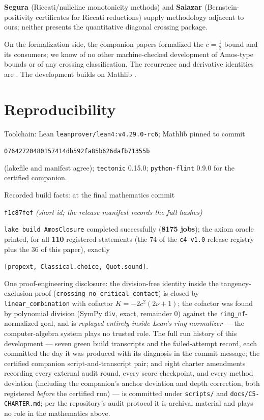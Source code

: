 \documentclass[11pt]{article}
\newcommand{\lean}[1]{\texttt{#1}}
\begin{document}
\textbf{Segura \cite{Segura21}} (Riccati/nullcline monotonicity
methods) and \textbf{Salazar \cite{Salazar26}} (Bernstein-positivity
certificates for Riccati reductions) supply methodology adjacent to
ours; neither presents the quantitative diagonal crossing package.

On the formalization side, the companion papers
\cite{ErikssonC2,ErikssonC3,ErikssonC4} formalized the
$c = \tfrac12$ bound and its consumers; we know of no other
machine-checked development of Amos-type bounds or of any crossing
classification.  The recurrence and derivative identities are
\cite[10.29]{DLMF}.  The development builds on Mathlib
\cite{mathlib20}.

\section{Reproducibility}\label{sec:repro}

Toolchain: Lean \lean{leanprover/lean4:v4.29.0-rc6}; Mathlib pinned
to commit
\begin{center}\small
\lean{07642720480157414db592fa85b626dafb71355b}
\end{center}
\noindent (lakefile and manifest agree); \lean{tectonic} 0.15.0;
\lean{python-flint} 0.9.0 for the certified companion.

\medskip
\noindent Recorded build facts: at the final mathematics commit
\begin{center}\small
\lean{f1c87fef} \emph{(short id; the release manifest records the
full hashes)}
\end{center}
\noindent \lean{lake build AmosClosure} completed successfully
(\textbf{8175 jobs}); the axiom oracle printed, for all
\textbf{110} registered statements (the 74 of the \lean{c4-v1.0}
release registry plus the 36 of this paper), exactly
\begin{center}
\lean{[propext, Classical.choice, Quot.sound]}.
\end{center}
\noindent One proof-engineering disclosure: the division-free
identity inside the tangency-exclusion proof
(\lean{crossing\_no\_critical\_contact}) is closed by
\lean{linear\_combination} with cofactor $K = -2c^2(2\nu+1)$; the
cofactor was found by polynomial division (SymPy \lean{div}, exact,
remainder $0$) against the \lean{ring\_nf}-normalized goal, and is
\emph{replayed entirely inside Lean's ring normalizer} --- the
computer-algebra system plays no trusted role.  The full run
history of this development --- seven green build transcripts and
the failed-attempt record, each committed the day it was produced
with its diagnosis in the commit message; the certified companion
script-and-transcript pair; and eight charter amendments recording
every external audit round, every score checkpoint, and every
method deviation (including the companion's anchor deviation and
depth correction, both registered \emph{before} the certified run)
--- is committed under \lean{scripts/} and
\lean{docs/C5-CHARTER.md}; per the repository's audit protocol it
is archival material and plays no role in the mathematics above.
\end{document}
